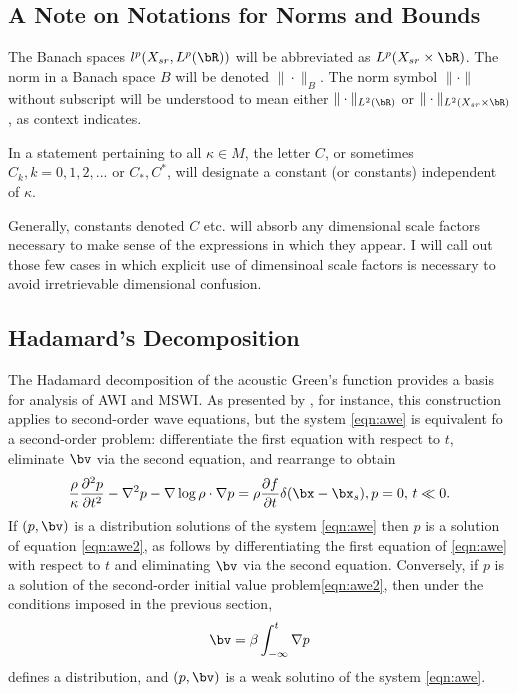 \subsection{A Note on Notations  for Norms and Bounds}
The Banach spaces
$l^p(X_{sr},L^p(\bR))$ will be abbreviated as $L^p(X_{sr} \times
\bR)$. The norm in a Banach space $B$ will be denoted
$\|\cdot\|_{B}$. The norm symbol
$\|\cdot\|$ without subscript will be understood to mean either
$\|\cdot\|_{L^2(\bR)}$ or $\|\cdot\|_{L^2(X_{sr}\times
  \bR)}$, as context indicates.

In a statement pertaining to all
$\kappa \in M$, the letter $C$, or sometimes $C_k,
k=0,1,2,...$ or
$C_*,C^*$, will designate a constant (or constants) independent of
$\kappa$.

Generally, constants denoted $C$ etc. will absorb any dimensional
scale factors necessary to make sense of the expressions in which they
appear. I will call out those few cases in which explicit use of
dimensinoal scale factors is necessary to avoid irretrievable
dimensional confusion.

\subsection{Hadamard's Decomposition}
The Hadamard decomposition of the acoustic Green's function \cite[]{Friedlander:75,Qian:JCP24} provides a
basis for analysis of AWI and MSWI. As presented by
\cite{Friedlander:75}, for instance, this construction applies to
second-order wave equations, but the system \ref{eqn:awe} is
equivalent fo a second-order problem: differentiate the first equation
with respect to $t$, eliminate $\bv$ via the second equation, and
rearrange to obtain
\begin{equation}
  \label{eqn:awe2}
  \frac{\rho}{\kappa}\frac{\partial^2 p}{\partial t^2} - \nabla^2 p -
  \nabla \log \rho \cdot \nabla p = \rho \frac{\partial f}{\partial t}
  \delta(\bx-\bx_s), \nonumber \\
  p=0, \, t \ll 0.
\end{equation}
If $(p,\bv)$ is a distribution solutions of the system
\ref{eqn:awe} then $p$ is a solution of equation
\ref{eqn:awe2}, as follows by differentiating the first equation of
\ref{eqn:awe} with respect to $t$ and eliminating $\bv$ via the second
equation. Conversely, if $p$ is a solution of the second-order initial
value problem\ref{eqn:awe2}, then under the conditions imposed in the
previous section,
\[
  \bv = \beta \int_{-\infty}^t \nabla p
\]
defines a distribution, and $(p,\bv)$ is a weak solutino of the system \ref{eqn:awe}.


